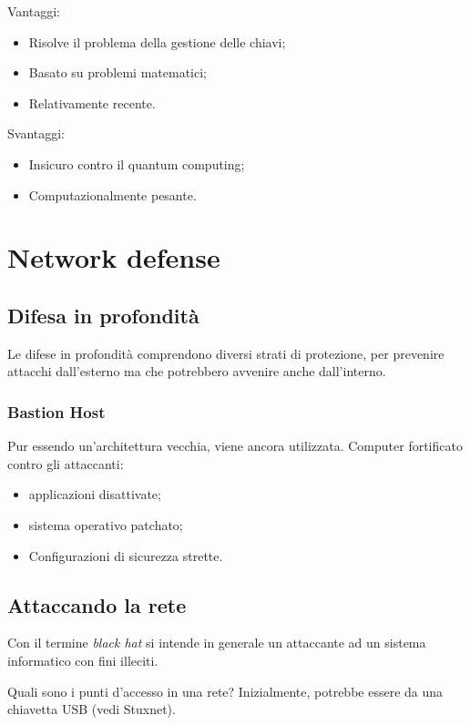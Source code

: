 Vantaggi:
\begin{itemize}
\item Risolve il problema della gestione delle chiavi;
\item Basato su problemi matematici;
\item Relativamente recente.
\end{itemize}

Svantaggi:
\begin{itemize}
\item Insicuro contro il quantum computing;
\item Computazionalmente pesante.
\end{itemize}


\section{Network defense}

\subsection{Difesa in profondità}
\label{sec:DefenseInDepth}

Le difese in profondità comprendono diversi strati di protezione, per prevenire
attacchi dall'esterno ma che potrebbero avvenire anche dall'interno.

\subsubsection{Bastion Host}

Pur essendo un'architettura vecchia, viene ancora utilizzata.
Computer fortificato contro gli attaccanti:
\begin{itemize}
\item applicazioni disattivate;
\item sistema operativo patchato;
\item Configurazioni di sicurezza strette.
\end{itemize}

\subsection{Attaccando la rete}
Con il termine \textit{black hat} si intende in generale un attaccante
ad un sistema informatico con fini illeciti.

Quali sono i punti d'accesso in una rete? Inizialmente, potrebbe essere
da una chiavetta USB (vedi Stuxnet).


